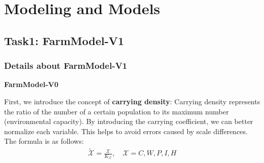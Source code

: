\documentclass[12pt]{article}  %
\begin{document}
\begin{table}[htbp]
\begin{center}
\begin{tabular}{cc}
        \bottomrule
    \end{tabular}\label{tb:notation}
    \end{center}
    \end{table}
\section{Modeling and Models}
\subsection{Task1: FarmModel-V1}
\subsubsection{Details about FarmModel-V1}
\noindent\textbf{FarmModel-V0}

First, we introduce the concept of \textbf{carrying density}: Carrying density 
represents the ratio of the number of a certain population to its maximum 
number (environmental capacity). By introducing the carrying coefficient, 
we can better normalize each variable. This helps to avoid errors caused 
by scale differences. The formula is as follows:
    \begin{align*}
        \tilde{\mathcal X}=\frac{\mathcal X}{K_{\mathcal X}},\quad \mathcal X=C,W,P,I,H
    \end{align*}
\end{document}
